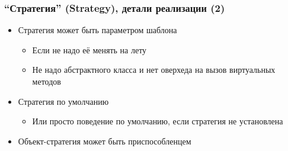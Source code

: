 \documentclass[xetex,mathserif,serif]{beamer}
\begin{document}
	\begin{frame}
		\frametitle{``Стратегия'' (Strategy), детали реализации (2)}
		\begin{itemize}
			\item Стратегия может быть параметром шаблона
			\begin{itemize}
				\item Если не надо её менять на лету
				\item Не надо абстрактного класса и нет оверхеда на вызов виртуальных методов
			\end{itemize}
			\item Стратегия по умолчанию
			\begin{itemize}
				\item Или просто поведение по умолчанию, если стратегия не установлена
			\end{itemize}
			\item Объект-стратегия может быть приспособленцем
		\end{itemize}
	\end{frame}
\end{document}
